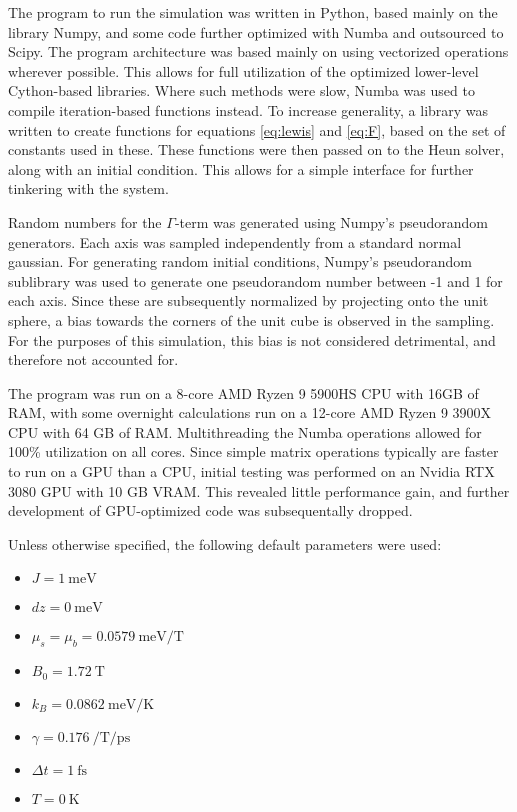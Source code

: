 The program to run the simulation was written in Python, based mainly on the library Numpy,
and some code further optimized with Numba and outsourced to Scipy. 
The program architecture was based mainly on using vectorized operations wherever possible. 
This allows for full utilization of the optimized lower-level Cython-based libraries. Where such methods were slow,
Numba was used to compile iteration-based functions instead.
To increase generality, a library was written to create functions for equations 
\ref{eq:lewis} and \ref{eq:F}, based on the set of constants used in these. 
These functions were then passed on to the Heun solver, along with an initial condition.
This allows for a simple interface for further tinkering with the system.

Random numbers for the $\Gamma$-term was generated using Numpy's pseudorandom generators.
Each axis was sampled independently from a standard normal gaussian.
For generating random initial conditions, Numpy's pseudorandom sublibrary was used to generate
one pseudorandom number between -1 and 1 for each axis. Since these are subsequently normalized by projecting
onto the unit sphere, a bias towards the corners of the unit cube is observed in the sampling.
For the purposes of this simulation, this bias is not considered detrimental, and therefore not accounted for.

The program was run on a 8-core AMD Ryzen 9 5900HS CPU with 16GB of RAM, 
with some overnight calculations run on a 12-core AMD Ryzen 9 3900X CPU with 64 GB of RAM.
Multithreading the Numba operations allowed for 100\% utilization on all cores.
Since simple matrix operations typically are faster to run on a GPU than a CPU,
initial testing was performed on an Nvidia RTX 3080 GPU with 10 GB VRAM. This revealed little performance gain, 
and further development of GPU-optimized code was subsequentally dropped.

Unless otherwise specified, the following default parameters were used: 
\begin{itemize}
    \item $J = \SI{1}{\milli\electronvolt}$
    \item $dz = \SI{0}{\milli\electronvolt}$
    \item $\mu_s = \mu_b = \SI{0.0579}{\milli\electronvolt\per\tesla}$
    \item $B_0 = \SI{1.72}{\tesla}$
    \item $k_B = \SI{0.0862}{\milli\electronvolt\per\kelvin}$
    \item $\gamma = \SI{0.176}{\per\tesla\per\pico\second}$
    \item $\Delta t = \SI{1}{\femto\second}$
    \item $T = \SI{0}{\kelvin}$
\end{itemize}

